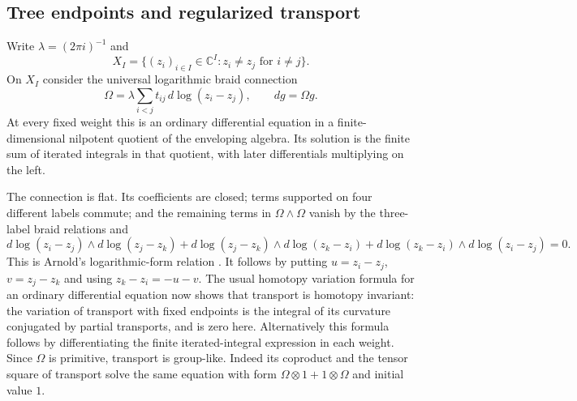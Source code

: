 \documentclass[11pt]{article}
\newcommand{\CC}{\mathbb C}
\theoremstyle{definition}
\theoremstyle{remark}
\numberwithin{equation}{section}
\begin{document}
\subsection{Tree endpoints and regularized transport}
Write $\lambda=(2\pi i)^{-1}$ and
\[
 X_I=\{(z_i)_{i\in I}\in\CC^I:z_i\ne z_j\text{ for }i\ne j\}.
\]
On $X_I$ consider the universal logarithmic braid connection
\cite[Section~1.3]{Kohno}
\begin{equation}\label{eq:holonomy-connection}
 \Omega=\lambda\sum_{i<j}t_{ij}\,d\log(z_i-z_j),
 \qquad dg=\Omega g.
\end{equation}
At every fixed weight this is an ordinary differential equation in a
finite-dimensional nilpotent quotient of the enveloping algebra.
Its solution is the finite sum of iterated integrals in that quotient,
with later differentials multiplying on the left.

The connection is flat.  Its coefficients are closed; terms supported
on four different labels commute; and the remaining terms in
$\Omega\wedge\Omega$ vanish by the three-label braid relations and
\[
 d\log(z_i-z_j)\wedge d\log(z_j-z_k)
 +d\log(z_j-z_k)\wedge d\log(z_k-z_i)
 +d\log(z_k-z_i)\wedge d\log(z_i-z_j)=0.
\]
This is Arnold's logarithmic-form relation \cite{Arnold}.
It follows by putting $u=z_i-z_j$, $v=z_j-z_k$ and using
$z_k-z_i=-u-v$.  The usual homotopy variation formula for an ordinary
differential equation now shows that transport is homotopy invariant:
the variation of transport with fixed endpoints is the integral of
its curvature conjugated by partial transports, and is zero here.
Alternatively this formula follows by differentiating the finite
iterated-integral expression in each weight.
Since $\Omega$ is primitive, transport is group-like.  Indeed its
coproduct and the tensor square of transport solve the same equation
with form $\Omega\otimes1+1\otimes\Omega$ and initial value $1$.
\end{document}
